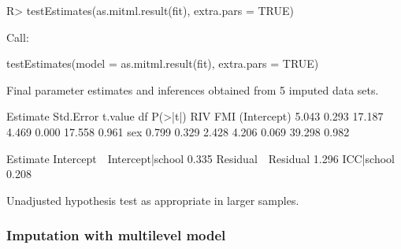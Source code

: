 \documentclass[
]{jss}
\begin{document}
\begin{CodeChunk}
\begin{CodeInput}
R> testEstimates(as.mitml.result(fit), extra.pars = TRUE)
\end{CodeInput}
\begin{CodeOutput}

Call:

testEstimates(model = as.mitml.result(fit), extra.pars = TRUE)

Final parameter estimates and inferences obtained from 5 imputed data sets.

             Estimate Std.Error   t.value        df   P(>|t|)       RIV       FMI 
(Intercept)     5.043     0.293    17.187     4.469     0.000    17.558     0.961 
sex             0.799     0.329     2.428     4.206     0.069    39.298     0.982 

                            Estimate 
Intercept~~Intercept|school    0.335 
Residual~~Residual             1.296 
ICC|school                     0.208 

Unadjusted hypothesis test as appropriate in larger samples.
\end{CodeOutput}
\end{CodeChunk}

\hypertarget{imputation-with-multilevel-model}{%
\subsubsection{Imputation with multilevel
model}\label{imputation-with-multilevel-model}}
\end{document}
